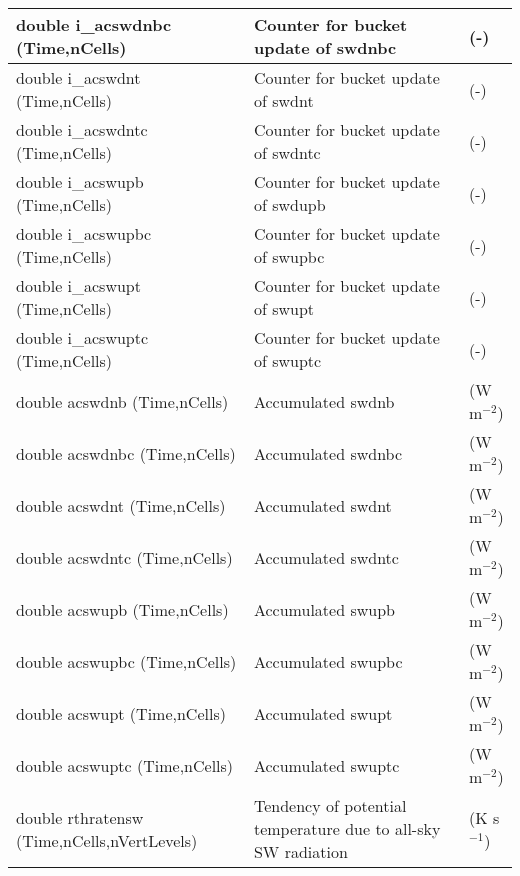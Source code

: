 {\begin{longtable}{|p{2.0in} |p{3.0in} |p{1.0in} |}
double i\_acswdnbc (Time,nCells) & Counter for bucket update of swdnbc & (-) \\ \hline
double i\_acswdnt (Time,nCells) & Counter for bucket update of swdnt & (-) \\ \hline
double i\_acswdntc (Time,nCells) & Counter for bucket update of swdntc & (-) \\ \hline
double i\_acswupb (Time,nCells) & Counter for bucket update of swdupb & (-) \\ \hline
double i\_acswupbc (Time,nCells) & Counter for bucket update of swupbc & (-) \\ \hline
double i\_acswupt (Time,nCells) & Counter for bucket update of swupt & (-) \\ \hline
double i\_acswuptc (Time,nCells) & Counter for bucket update of swuptc & (-) \\ \hline
double acswdnb (Time,nCells) & Accumulated swdnb & (W m$^{-2}$) \\ \hline
double acswdnbc (Time,nCells) & Accumulated swdnbc & (W m$^{-2}$) \\ \hline
double acswdnt (Time,nCells) & Accumulated swdnt & (W m$^{-2}$) \\ \hline
double acswdntc (Time,nCells) & Accumulated swdntc & (W m$^{-2}$) \\ \hline
double acswupb (Time,nCells) & Accumulated swupb & (W m$^{-2}$) \\ \hline
double acswupbc (Time,nCells) & Accumulated swupbc & (W m$^{-2}$) \\ \hline
double acswupt (Time,nCells) & Accumulated swupt & (W m$^{-2}$) \\ \hline
double acswuptc (Time,nCells) & Accumulated swuptc & (W m$^{-2}$) \\ \hline
double rthratensw \hfil\break (Time,nCells,nVertLevels) & Tendency of potential temperature due to all-sky SW radiation & (K s$^{-1}$) \\ \hline


\end{longtable}}
